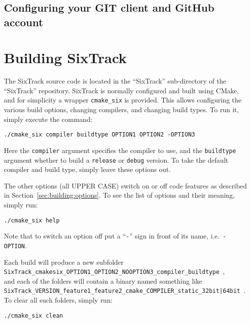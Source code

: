 \documentclass[english,BCOR=0mm,DIV=18]{scrartcl}
\begin{document}
\subsection{Configuring your GIT client and GitHub account}
\label{sec:contributing:git}


\section{Building SixTrack}
\label{sec:building}

The SixTrack source code is located in the ``SixTrack'' sub-directory of the ``SixTrack'' repository.
SixTrack is normally configured and built using CMake, and for simplicity a wrapper \texttt{cmake\_six} is provided.
This allows configuring the various build options, changing compilers, and changing build types.
To run it, simply execute the command:
\begin{lstlisting}
./cmake_six compiler buildtype OPTION1 OPTION2 -OPTION3
\end{lstlisting}
Here the \texttt{compiler} argument specifies the compiler to use, and the \texttt{buildtype} argument whether to build a \texttt{release} or \texttt{debug} version.
To take the default compiler and build type, simply leave these options out.

The other options (all UPPER CASE) switch on or off code features as described in Section~\ref{sec:building:options}.
To see the list of options and their meaning, simply run:
\begin{lstlisting}
./cmake_six help
\end{lstlisting}
Note that to switch an option off put a ``\texttt{-}'' sign in front of its name, i.e.\ \texttt{-OPTION}.

Each build will produce a new subfolder\\
\texttt{SixTrack\_\-cmakesix\_\-OPTION1\_\-OPTION2\_\-NOOPTION3\_\-compiler\_\-buildtype}~,\\
and each of the folders will contain a binary named something like\\
\texttt{SixTrack\_VERSION\_feature1\_feature2\_cmake\_COMPILER\_static\_{32bit|64bit}}~.\\
To clear all such folders, simply run:
\begin{lstlisting}
./cmake_six clean
\end{lstlisting}
\end{document}
